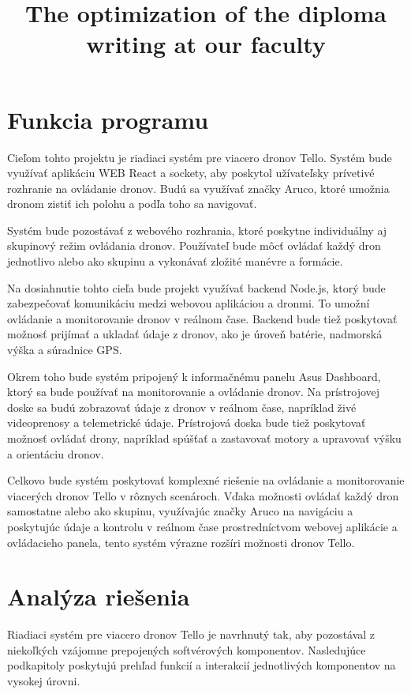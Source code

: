 \documentclass[a4paper]{feidipsp}
\title{The optimization of the diploma writing at our faculty}
\begin{document}


\titulnastrana

\tableofcontents

\newpage

\setcounter{page}{1}

\section{Funkcia programu}

Cieľom tohto projektu je riadiaci systém pre viacero dronov Tello. Systém bude využívať aplikáciu WEB React a sockety, aby poskytol užívateľsky prívetivé rozhranie na ovládanie dronov. Budú sa využívať značky Aruco, ktoré umožnia dronom zistiť ich polohu a podľa toho sa navigovať.

Systém bude pozostávať z webového rozhrania, ktoré poskytne individuálny aj skupinový režim ovládania dronov. Používateľ bude môcť ovládať každý dron jednotlivo alebo ako skupinu a vykonávať zložité manévre a formácie.

Na dosiahnutie tohto cieľa bude projekt využívať backend Node.js, ktorý bude zabezpečovať komunikáciu medzi webovou aplikáciou a dronmi. To umožní ovládanie a monitorovanie dronov v reálnom čase. Backend bude tiež poskytovať možnosť prijímať a ukladať údaje z dronov, ako je úroveň batérie, nadmorská výška a súradnice GPS.

Okrem toho bude systém pripojený k informačnému panelu Asus Dashboard, ktorý sa bude používať na monitorovanie a ovládanie dronov. Na prístrojovej doske sa budú zobrazovať údaje z dronov v reálnom čase, napríklad živé videoprenosy a telemetrické údaje. Prístrojová doska bude tiež poskytovať možnosť ovládať drony, napríklad spúšťať a zastavovať motory a upravovať výšku a orientáciu dronov.

Celkovo bude systém poskytovať komplexné riešenie na ovládanie a monitorovanie viacerých dronov Tello v rôznych scenároch. Vďaka možnosti ovládať každý dron samostatne alebo ako skupinu, využívajúc značky Aruco na navigáciu a poskytujúc údaje a kontrolu v reálnom čase prostredníctvom webovej aplikácie a ovládacieho panela, tento systém výrazne rozšíri možnosti dronov Tello.

\section{Analýza riešenia}

Riadiaci systém pre viacero dronov Tello je navrhnutý tak, aby pozostával z niekoľkých vzájomne prepojených softvérových komponentov. Nasledujúce podkapitoly poskytujú prehľad funkcií a interakcií jednotlivých komponentov na vysokej úrovni.
\end{document}
